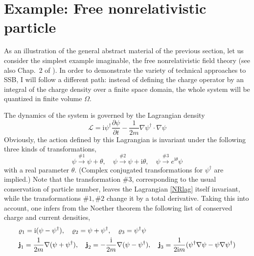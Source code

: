 \documentclass[final,2p,times,12pt,sort&compress]{elsarticle}
\newcommand\Lag{\mathscr{L}}                %
\newcommand\vek[1]{{\boldsymbol{\bf #1}}}   %
\newcommand\he[1]{#1^{\dagger}}             %
\newcommand\imag{\mathrm i}                 %
\newcommand\vr{\varrho}
\newcommand\vt{\theta}
\newcommand\PD[2]{\frac{\partial #1}{\partial #2}} %
\begin{document}

\section{Example: Free nonrelativistic particle}
\label{sec:freeNR} As an illustration of the general abstract material of the
previous section, let us consider the simplest example imaginable, the free
nonrelativistic field theory (see also Chap.~2 of \cite{Miransky:1993mi}). In
order to demonstrate the variety of technical approaches to SSB, I will follow a
different path: instead of defining the charge operator by an integral of the
charge density over a finite space domain, the whole system will be quantized
in finite volume $\Omega$.

The dynamics of the system is governed by the Lagrangian density
\begin{equation}
\Lag=\imag\he\psi\PD\psi t-\frac1{2m}\nabla\he\psi\cdot\nabla\psi
\label{NRlag}
\end{equation}
Obviously, the action defined by this Lagrangian is invariant under the
following three kinds of transformations,
\begin{equation}
\psi\xrightarrow{\#1}\psi+\vt,\quad
\psi\xrightarrow{\#2}\psi+\imag\vt,\quad
\psi\xrightarrow{\#3} e^{\imag\vt}\psi
\label{NRfreetransfo}
\end{equation}
with a real parameter $\vt$. (Complex conjugated transformations for $\he\psi$
are implied.) Note that the transformation $\#3$, corresponding to the usual
conservation of particle number, leaves the Lagrangian \eqref{NRlag} itself
invariant, while the transformations $\#1,\#2$ change it by a total derivative.
Taking this into account, one infers from the Noether theorem the following
list of conserved charge and current densities,
\begin{equation}
\begin{split}
&\vr_1=\imag(\psi-\he\psi),\quad
\vr_2=\psi+\he\psi,\quad
\vr_3=\he\psi\psi\\
&\vek j_1=\frac1{2m}\nabla(\psi+\he\psi),\quad
\vek j_2=-\frac{\imag}{2m}\nabla(\psi-\he\psi),\quad
\vek j_3=\frac{1}{2\imag m}(\he\psi\nabla\psi-\psi\nabla\he\psi)
\end{split}
\end{equation}
\end{document}
